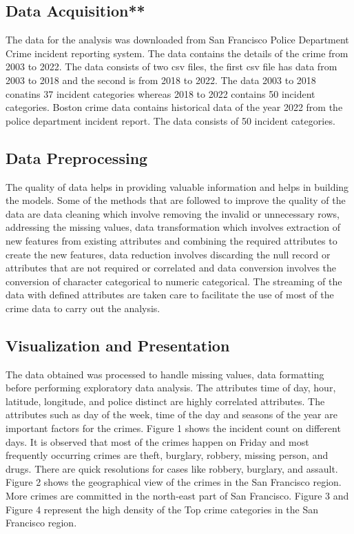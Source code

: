 \documentclass[conference,final,]{IEEEtran}
\begin{document}
\subsection{Data Acquisition**}\label{data-acquisition}

The data for the analysis was downloaded from San Francisco Police
Department Crime incident reporting system. The data contains the
details of the crime from 2003 to 2022. The data consists of two csv files, the
first csv file has data from 2003 to 2018 and the second is from 2018 to
2022. The data 2003 to 2018 conatins 37 incident categories whereas
2018 to 2022 contains 50 incident categories. Boston crime data contains
historical data of the year 2022 from the police department incident
report. The data consists of 50 incident categories.

\subsection{Data Preprocessing}\label{data-preprocessing}

The quality of data helps in providing valuable information and helps in
building the models. Some of the methods that are followed to improve
the quality of the data are data cleaning which involve removing the
invalid or unnecessary rows, addressing the missing values, data
transformation which involves extraction of new features from existing
attributes and combining the required attributes to create the new
features, data reduction involves discarding the null record or
attributes that are not required or correlated and data conversion
involves the conversion of character categorical to numeric categorical.
The streaming of the data with defined attributes are taken care to
facilitate the use of most of the crime data to carry out the analysis.

\subsection{Visualization and
Presentation}\label{visualization-and-presentation}

The data obtained was processed to handle missing values, data
formatting before performing exploratory data analysis. The attributes
time of day, hour, latitude, longitude, and police distinct are highly
correlated attributes. The attributes such as day of the week, time of
the day and seasons of the year are important factors for the crimes.
Figure 1 shows the incident count on different days. It is observed that
most of the crimes happen on Friday and most frequently occurring crimes
are theft, burglary, robbery, missing person, and drugs. There are quick
resolutions for cases like robbery, burglary, and assault. Figure 2
shows the geographical view of the crimes in the San Francisco region.
More crimes are committed in the north-east part of San Francisco.
Figure 3 and Figure 4 represent the high density of the Top crime
categories in the San Francisco region.
\end{document}

